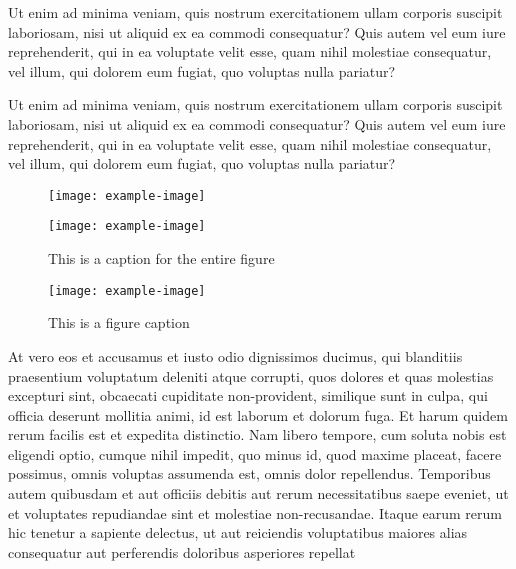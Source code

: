\documentclass{class}
\begin{document}
Ut enim ad minima veniam, quis nostrum exercitationem ullam corporis suscipit laboriosam, nisi ut aliquid ex ea commodi consequatur? Quis autem vel eum iure reprehenderit, qui in ea voluptate velit esse, quam nihil molestiae consequatur, vel illum, qui dolorem eum fugiat, quo voluptas nulla pariatur?


Ut enim ad minima veniam, quis nostrum exercitationem ullam corporis suscipit laboriosam, nisi ut aliquid ex ea commodi consequatur? Quis autem vel eum iure reprehenderit, qui in ea voluptate velit esse, quam nihil molestiae consequatur, vel illum, qui dolorem eum fugiat, quo voluptas nulla pariatur?


\begin{figure}
  \begin{minipage}{0.47\textwidth}
    \texttt{[image: example-image]}
  \end{minipage}
  \hfill
  \begin{minipage}{0.47\textwidth}
    \texttt{[image: example-image]}
  \end{minipage}

  \caption{This is a caption for the entire figure}
  \label{fig:twosubs}
\end{figure}

\begin{sidewaysfigure}
  \centering
  \texttt{[image: example-image]}
  \caption{This is a figure caption}
  \label{fig:landscape}
\end{sidewaysfigure}

At vero eos et accusamus et iusto odio dignissimos ducimus, qui blanditiis praesentium voluptatum deleniti atque corrupti, quos dolores et quas molestias excepturi sint, obcaecati cupiditate non-provident, similique sunt in culpa, qui officia deserunt mollitia animi, id est laborum et dolorum fuga. Et harum quidem rerum facilis est et expedita distinctio. Nam libero tempore, cum soluta nobis est eligendi optio, cumque nihil impedit, quo minus id, quod maxime placeat, facere possimus, omnis voluptas assumenda est, omnis dolor repellendus. Temporibus autem quibusdam et aut officiis debitis aut rerum necessitatibus saepe eveniet, ut et voluptates repudiandae sint et molestiae non-recusandae. Itaque earum rerum hic tenetur a sapiente delectus, ut aut reiciendis voluptatibus maiores alias consequatur aut perferendis doloribus asperiores repellat
\end{document}

